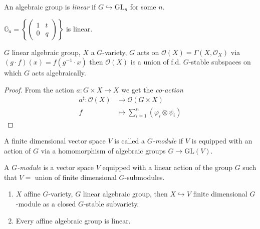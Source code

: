 \begin{definition}
\label{definition-linear-algebraic-group}
An algebraic group is {\it linear} if $G \hookrightarrow \text{GL}_n$ for some
$n$.
\end{definition}

\begin{example}
\label{example-multiplicative-group-is-linear}
$\mathbb{G}_a=\left\{\begin{pmatrix}
1&t\\ 
0&q
\end{pmatrix}\right\}$ is linear.
\end{example}

\begin{proposition}
\label{proposition-co-action}
$G$ linear algebraic group,  $X$ a $G$-variety, $G$ acts on
$\mathcal{O}(X)=\Gamma(X,\mathcal{O}_X)$ via $(g\cdot f)(x)=f(g^{-1}\cdot x)$
then $\mathcal{O}(X)$ is a union of f.d. $G$-stable subspaces on which $G$ acts
algebraically.
\end{proposition}

\begin{proof}
From the action $a:G \times X \to X$ we get the {\it co-action} 
\begin{align*}
a^\sharp: \mathcal{O}(X) &\longrightarrow \mathcal{O}(G \times X) \\
f &\longmapsto \sum_{i=1}^n(\varphi_i \otimes \psi_i)
\end{align*}
\end{proof}

\begin{definition}
\label{definition-G-module}
A finite dimensional vector space $V$ is called a {\it $G$-module} if $V$ is equipped
with an action of $G$ via a homomorphism of algebraic groups 
$G \to \text{GL}(V)$.

A  {\it $G$-module} is a vector space $V$ equipped with a linear action of the
group $G$ such that $V=$ union of finite dimensional $G$-submodules.
\end{definition}

\begin{proposition}
\label{proposition-G-modules}
 \begin{enumerate}
\item $X$ affine $G$-variety, $G$ linear algebraic group, then $X
\hookrightarrow  V$ finite dimensional $G$-module as a closed $G$-stable
subvariety.
\item Every affine algebraic group is linear.
\end{enumerate}
\end{proposition}

